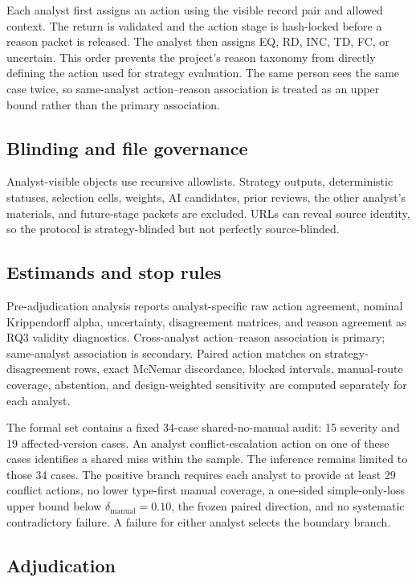 \documentclass[preprint,review,12pt,authoryear]{elsarticle}
\begin{document}
Each analyst first assigns an action using the visible record pair and allowed
context. The return is validated and the action stage is hash-locked before a
reason packet is released. The analyst then assigns EQ, RD, INC, TD, FC, or
uncertain. This order prevents the project's reason taxonomy from directly
defining the action used for strategy evaluation. The same person sees the same
case twice, so same-analyst action--reason association is treated as an upper
bound rather than the primary association.

\subsection{Blinding and file governance}

Analyst-visible objects use recursive allowlists. Strategy outputs,
deterministic statuses, selection cells, weights, AI candidates, prior reviews,
the other analyst's materials, and future-stage packets are excluded. URLs can
reveal source identity, so the protocol is strategy-blinded but not perfectly
source-blinded.

\subsection{Estimands and stop rules}

Pre-adjudication analysis reports analyst-specific raw action agreement,
nominal Krippendorff alpha, uncertainty, disagreement matrices, and reason
agreement as RQ3 validity diagnostics. Cross-analyst action--reason association
is primary; same-analyst association is secondary. Paired action matches on
strategy-disagreement rows, exact McNemar discordance, blocked intervals,
manual-route coverage, abstention, and design-weighted sensitivity are computed
separately for each analyst.

The formal set contains a fixed 34-case shared-no-manual audit: 15 severity and
19 affected-version cases. An analyst conflict-escalation action on one of these
cases identifies a shared miss within the sample. The inference remains limited
to those 34 cases. The positive branch requires each analyst to provide at least
29 conflict actions, no lower type-first manual coverage, a one-sided
simple-only-loss upper bound below \(\delta_{\mathrm{manual}}=0.10\), the frozen
paired direction, and no systematic contradictory failure. A failure for either
analyst selects the boundary branch.

\subsection{Adjudication}
\end{document}
